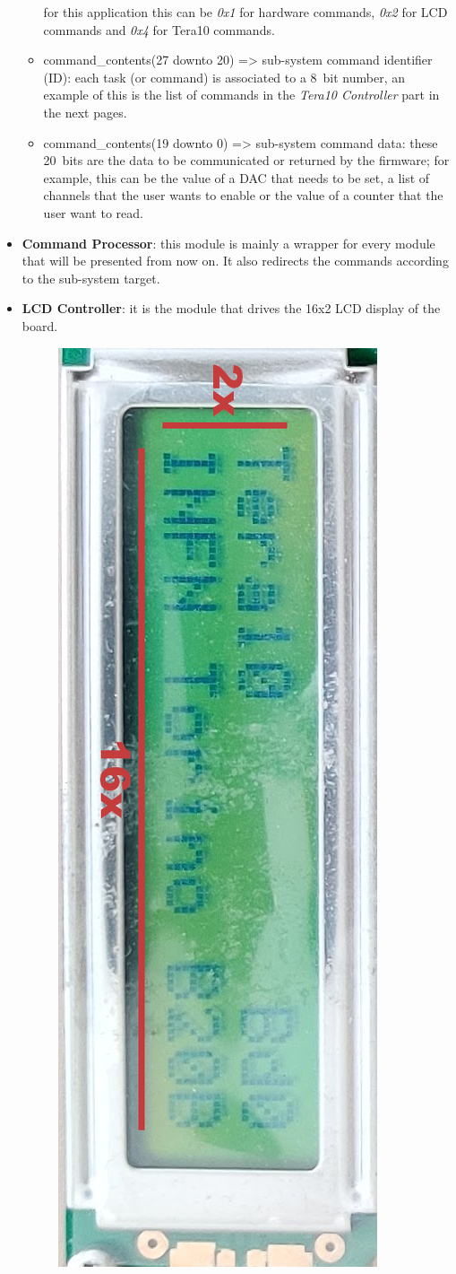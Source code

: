 \begin{itemize}
\begin{itemize}
		\newline
		for this application this can be \textit{0x1} for hardware commands, \textit{0x2} for LCD commands and \textit{0x4} for Tera10 commands.
		\item command\_contents(27 downto 20) => sub-system command identifier (ID):
		\newline
		each task (or command) is associated to a 8~bit number, an example of this is the list of commands in the \textit{Tera10 Controller} part in the next pages.
		\item command\_contents(19 downto 0) => sub-system command data:
		\newline
		these 20~bits are the data to be communicated or returned by the firmware; for example, this can be the value of a DAC that needs to be set, a list of channels that the user wants to enable or the value of a counter that the user want to read. 
	\end{itemize} 
	\item \textbf{Command Processor}: this module is mainly a wrapper for every module that will be presented from now on. It also 
	redirects the commands according to the sub-system target.
	\item \textbf{LCD Controller}: it is the module that drives the 16x2 LCD display of the board.
	\begin{figure}[H]
		\centering
		\includegraphics[width=0.5\linewidth]{IMG/ch4/LCD}

\end{figure}
\end{itemize}

